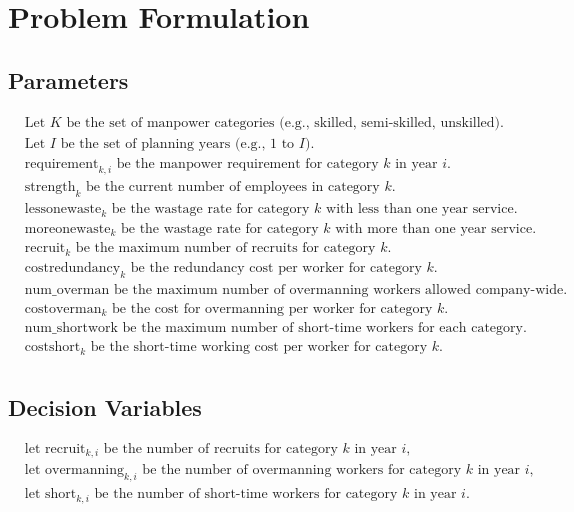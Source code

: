 \documentclass{article}
\begin{document}
\section*{Problem Formulation}

\subsection*{Parameters}
\begin{align*}
    & \text{Let } K \text{ be the set of manpower categories (e.g., skilled, semi-skilled, unskilled)}. \\
    & \text{Let } I \text{ be the set of planning years (e.g., 1 to } I \text{)}. \\
    & \text{requirement}_{k, i} \text{ be the manpower requirement for category } k \text{ in year } i. \\
    & \text{strength}_{k} \text{ be the current number of employees in category } k. \\
    & \text{lessonewaste}_{k} \text{ be the wastage rate for category } k \text{ with less than one year service}. \\
    & \text{moreonewaste}_{k} \text{ be the wastage rate for category } k \text{ with more than one year service}. \\
    & \text{recruit}_{k} \text{ be the maximum number of recruits for category } k. \\
    & \text{costredundancy}_{k} \text{ be the redundancy cost per worker for category } k. \\
    & \text{num\_overman} \text{ be the maximum number of overmanning workers allowed company-wide}. \\
    & \text{costoverman}_{k} \text{ be the cost for overmanning per worker for category } k. \\
    & \text{num\_shortwork} \text{ be the maximum number of short-time workers for each category}. \\
    & \text{costshort}_{k} \text{ be the short-time working cost per worker for category } k. \\
\end{align*}

\subsection*{Decision Variables}
\begin{align*}
    & \text{let } \text{recruit}_{k, i} \text{ be the number of recruits for category } k \text{ in year } i, \\
    & \text{let } \text{overmanning}_{k, i} \text{ be the number of overmanning workers for category } k \text{ in year } i, \\
    & \text{let } \text{short}_{k, i} \text{ be the number of short-time workers for category } k \text{ in year } i.
\end{align*}
\end{document}
